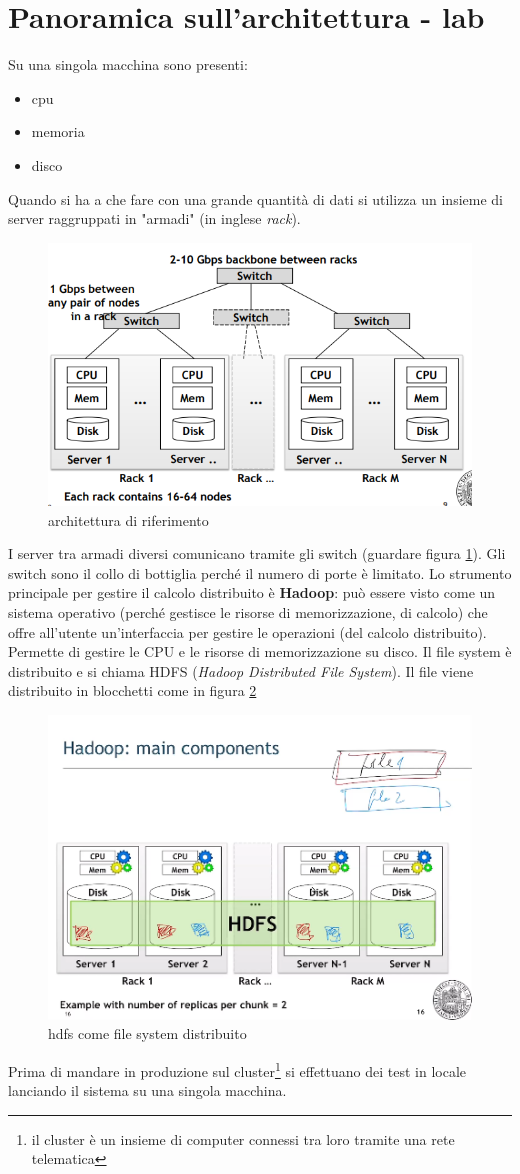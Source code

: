 \documentclass[italian,10pt,a4paper]{report}
\begin{document}
	\section{Panoramica sull'architettura - lab}
	Su una singola macchina sono presenti:
	\begin{itemize}
		\item cpu
		\item memoria
		\item disco
	\end{itemize}
	Quando si ha a che fare con una grande quantità di dati si utilizza un insieme di server raggruppati in "armadi" (in inglese \textit{rack}).
	
	\begin{figure}
		\centering
		\includegraphics[width=0.7\linewidth]{img/racks}
		\caption{architettura di riferimento}
		\label{fig:racks}
	\end{figure}

	I server tra armadi diversi comunicano tramite gli switch (guardare figura \ref{fig:racks}). Gli switch sono il collo di bottiglia perché il numero di porte è limitato. Lo strumento principale per gestire il calcolo distribuito è \textbf{Hadoop}: può essere visto come un sistema operativo (perché gestisce le risorse di memorizzazione, di calcolo) che offre all'utente un'interfaccia per gestire le operazioni (del calcolo distribuito). Permette di gestire le CPU e le risorse di memorizzazione su disco.
	Il file system è distribuito e si chiama HDFS (\textit{Hadoop Distributed File System}). Il file viene distribuito in blocchetti come in figura \ref{fig:hdfs}
	\begin{figure}
		\centering
		\includegraphics[width=0.7\linewidth]{img/hdfs}
		\caption{hdfs come file system distribuito}
		\label{fig:hdfs}
	\end{figure}
	Prima di mandare in produzione sul cluster\footnote{il cluster è un insieme di computer connessi tra loro tramite una rete telematica} si effettuano dei test in locale lanciando il sistema su una singola macchina.
	
\end{document}
